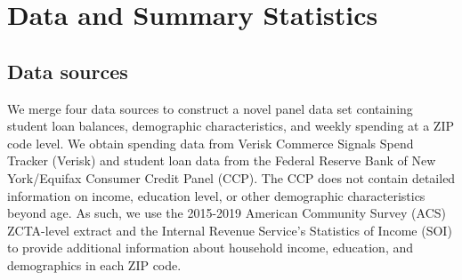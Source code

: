 \documentclass[12pt]{article}
\begin{document}




\section{Data and Summary Statistics \label{sec:dataandsummarystats}}

\subsection{Data sources}

We merge four data sources to construct a novel panel data  set containing student loan balances, demographic characteristics, and weekly spending at a ZIP code level. We obtain spending data from Verisk Commerce Signals Spend Tracker (Verisk) and student loan data from the Federal Reserve Bank of New York/Equifax Consumer Credit Panel (CCP). The CCP does not contain detailed information on income, education level, or other demographic characteristics beyond age.  As such, we use the 2015-2019 American Community Survey (ACS) ZCTA-level extract and the Internal Revenue Service’s Statistics of Income (SOI) to provide additional information about household income, education, and demographics in each ZIP code.
\end{document}
